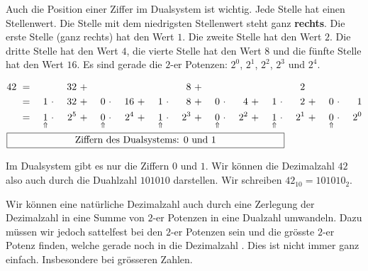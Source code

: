 Auch die Position einer Ziffer im Dualsystem ist wichtig. Jede Stelle hat einen Stellenwert. Die Stelle mit dem niedrigsten Stellenwert steht ganz \textbf{rechts}. Die erste Stelle (ganz rechts) hat den Wert $1$. Die zweite Stelle hat den Wert $2$. Die dritte Stelle hat den Wert $4$, die vierte Stelle hat den Wert $8$ und die fünfte Stelle hat den Wert $16$. Es sind gerade die $2$-er Potenzen: $2^0$, $2^1$, $2^2$, $2^3$ und $2^4$.

\begin{example}

\begin{alignat*}{16}
42 & ~ = ~ & & & 32 & ~ + ~ & & & & & & & 8 & ~ + ~ & & & & & & & 2 &\\
& ~ = ~ & 1 & ~\cdot~ & 32 & ~ + ~ & 0 & ~\cdot~ & 16 & ~ + ~ & 1 & ~\cdot~ & 8 & ~ + ~ & 0 & ~\cdot~ & 4 & ~ + ~ & 1 & ~\cdot~ & 2 & ~ + ~ & 0 & ~\cdot~ & 1 \\
& ~ = ~ & \underset{\Uparrow}{1} & ~\cdot~ & 2^5  & ~ + ~ & \underset{\Uparrow}{0} & ~\cdot~ & 2^4  & ~ + ~ & \underset{\Uparrow}{1} & ~\cdot~ & 2^3 & ~ + ~ & \underset{\Uparrow}{0} & ~\cdot~ & 2^2 & ~ + ~ & \underset{\Uparrow}{1} & ~\cdot~ & 2^1 & ~ + ~ & \underset{\Uparrow}{0} & ~\cdot~ & 2^0 \\
\omit\rlap{\framebox[10cm]{Ziffern des Dualsystems: $0$ und $1$}}
\end{alignat*}

Im Dualsystem gibt es nur die Ziffern $0$ und $1$. Wir können die Dezimalzahl $42$ also auch durch die Duahlzahl $101010$ darstellen. Wir schreiben $42_{10} = 101010_2$.

\end{example}

Wir können eine natürliche Dezimalzahl auch durch eine Zerlegung der Dezimalzahl in eine Summe von $2$-er Potenzen in eine Dualzahl umwandeln. Dazu müssen wir jedoch sattelfest bei den $2$-er Potenzen sein und die grösste $2$-er Potenz finden, welche gerade noch in die Dezimalzahl . Dies ist nicht immer ganz einfach. Insbesondere bei grösseren Zahlen.


